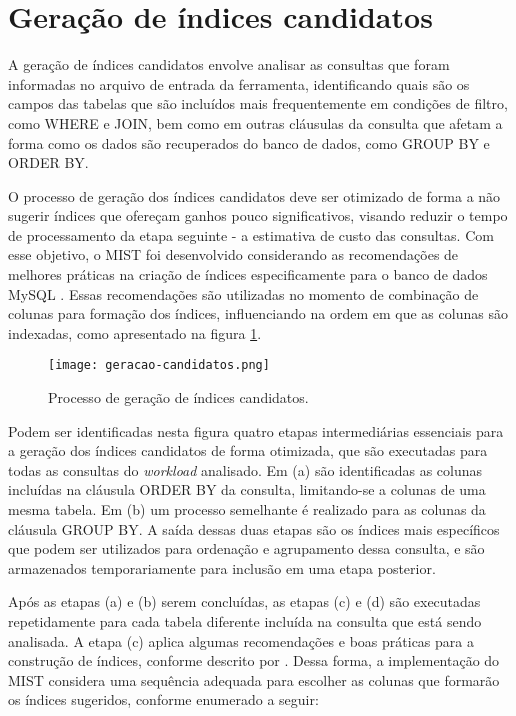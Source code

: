 \section{Geração de índices candidatos}
\label{geracao-indices-candidatos}

A geração de índices candidatos envolve analisar as consultas que foram informadas no arquivo de entrada da ferramenta, identificando quais são os campos das tabelas que são incluídos mais frequentemente em condições de filtro, como WHERE e JOIN, bem como em outras cláusulas da consulta que afetam a forma como os dados são recuperados do banco de dados, como GROUP BY e ORDER BY.

O processo de geração dos índices candidatos deve ser otimizado de forma a não sugerir índices que ofereçam ganhos pouco significativos, visando reduzir o tempo de processamento da etapa seguinte - a estimativa de custo das consultas. Com esse objetivo, o MIST foi desenvolvido considerando as recomendações de melhores práticas na criação de índices especificamente para o banco de dados MySQL \cite{MySQL57Ref:Indexes}. Essas recomendações são utilizadas no momento de combinação de colunas para formação dos índices, influenciando na ordem em que as colunas são indexadas, como apresentado na figura \ref{fig:geracao-candidatos}.

\begin{figure}[!ht]
  \centering
  \caption{Processo de geração de índices candidatos.}
  \texttt{[image: geracao-candidatos.png]}
  \label{fig:geracao-candidatos}
\end{figure}

Podem ser identificadas nesta figura quatro etapas intermediárias essenciais para a geração dos índices candidatos de forma otimizada, que são executadas para todas as consultas do \textit{workload} analisado. Em (a) são identificadas as colunas incluídas na cláusula ORDER BY da consulta, limitando-se a colunas de uma mesma tabela. Em (b) um processo semelhante é realizado para as colunas da cláusula GROUP BY. A saída dessas duas etapas são os índices mais específicos que podem ser utilizados para ordenação e agrupamento dessa consulta, e são armazenados temporariamente para inclusão em uma etapa posterior.

Após as etapas (a) e (b) serem concluídas, as etapas (c) e (d) são executadas repetidamente para cada tabela diferente incluída na consulta que está sendo analisada. A etapa (c) aplica algumas recomendações e boas práticas para a construção de índices, conforme descrito por . Dessa forma, a implementação do MIST considera uma sequência adequada para escolher as colunas que formarão os índices sugeridos, conforme enumerado a seguir:


